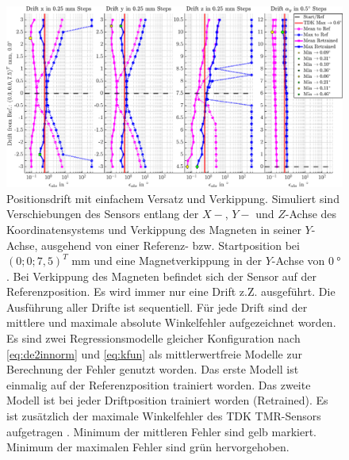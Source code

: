 \clearpage
\begin{figure}[tph]
	\centering
	\includegraphics[width=\linewidth]{chapters/images/4-EuOExp/Drift-Model-Errors}
	\caption[Positionsdrift mit einfachem Versatz und Verkippung]{Positionsdrift mit einfachem Versatz und Verkippung. Simuliert sind Verschiebungen des Sensors entlang der $X-$, $Y-$ und $Z$-Achse des Koordinatensystems und Verkippung des Magneten in seiner $Y$-Achse, ausgehend von einer Referenz- bzw. Startposition bei $(0;0;7,5)^T$ mm und eine Magnetverkippung in der $Y$-Achse von $\SI{0}{\degree}$. Bei Verkippung des Magneten befindet sich der Sensor auf der Referenzposition. Es wird immer nur eine Drift z.Z. ausgeführt. Die Ausführung aller Drifte ist sequentiell. Für jede Drift sind der mittlere und maximale absolute Winkelfehler aufgezeichnet worden. Es sind zwei Regressionsmodelle gleicher Konfiguration nach \autoref{eq:de2innorm} und \autoref{eq:kfun} als mittlerwertfreie Modelle zur Berechnung der Fehler genutzt worden. Das erste Modell ist einmalig auf der Referenzposition trainiert worden. Das zweite Modell ist bei jeder Driftposition trainiert worden (Retrained). Es ist zusätzlich der maximale Winkelfehler des TDK TMR-Sensors aufgetragen \cite{TDK2016}. Minimum der mittleren Fehler sind gelb markiert. Minimum der maximalen Fehler sind grün hervorgehoben.}
	\label{fig:drift-model-errors}
\end{figure}


